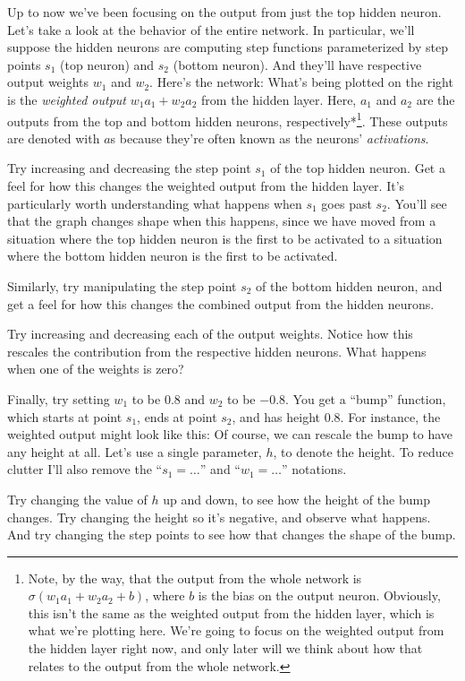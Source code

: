 Up to now we've been focusing on the output from just the top hidden neuron. Let's take a look at the behavior of the entire network. In particular, we'll suppose the hidden neurons are computing step functions parameterized by step points $s_1$ (top neuron) and $s_2$ (bottom neuron). And they'll have respective output weights $w_1$ and $w_2$. Here's the network: What's being plotted on the right is the \emph{weighted output} $w_1 a_1 + w_2 a_2$ from the hidden layer. Here, $a_1$ and $a_2$ are the outputs from the top and bottom hidden neurons, respectively*\footnote{Note, by the way, that the output from the whole network is $\sigma(w_1 a_1+w_2 a_2 + b)$, where $b$ is the bias on the output neuron. Obviously, this isn't the same as the weighted output from the hidden layer, which is what we're plotting here. We're going to focus on the weighted output from the hidden layer right now, and only later will we think about how that relates to the output from the whole network.}. These outputs are denoted with $a$s because they're often known as the neurons' \emph{activations}.


Try increasing and decreasing the step point $s_1$ of the top hidden neuron. Get a feel for how this changes the weighted output from the hidden layer. It's particularly worth understanding what happens when $s_1$ goes past $s_2$. You'll see that the graph changes shape when this happens, since we have moved from a situation where the top hidden neuron is the first to be activated to a situation where the bottom hidden neuron is the first to be activated.


Similarly, try manipulating the step point $s_2$ of the bottom hidden neuron, and get a feel for how this changes the combined output from the hidden neurons.


Try increasing and decreasing each of the output weights. Notice how this rescales the contribution from the respective hidden neurons. What happens when one of the weights is zero?


Finally, try setting $w_1$ to be $0.8$ and $w_2$ to be $-0.8$. You get a ``bump'' function, which starts at point $s_1$, ends at point $s_2$, and has height $0.8$. For instance, the weighted output might look like this: Of course, we can rescale the bump to have any height at all. Let's use a single parameter, $h$, to denote the height. To reduce clutter I'll also remove the ``$s_1 = \ldots$'' and ``$w_1 = \ldots$'' notations.


Try changing the value of $h$ up and down, to see how the height of the bump changes. Try changing the height so it's negative, and observe what happens. And try changing the step points to see how that changes the shape of the bump.


